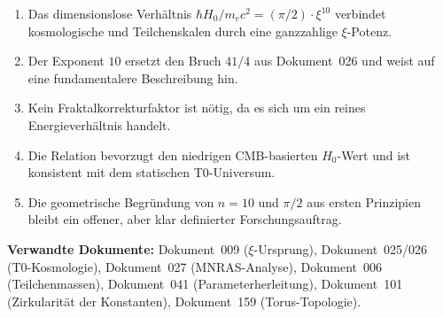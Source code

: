 \begin{foundation}
    \begin{enumerate}
        \item Das dimensionslose Verhältnis
              $\hbar H_0 / m_e c^2 = (\pi/2) \cdot \xi^{10}$ verbindet
              kosmologische und Teilchenskalen durch eine ganzzahlige
              $\xi$-Potenz.
        \item Der Exponent $10$ ersetzt den Bruch $41/4$ aus Dokument~026
              und weist auf eine fundamentalere Beschreibung hin.
        \item Kein Fraktal\-korrekturfaktor ist nötig, da es sich um ein
              reines Energieverhältnis handelt.
        \item Die Relation bevorzugt den niedrigen CMB-basierten
              $H_0$-Wert und ist konsistent mit dem statischen
              T0-Universum.
        \item Die geometrische Begründung von $n = 10$ und $\pi/2$ aus
              ersten Prinzipien bleibt ein offener, aber
              klar definierter Forschungsauftrag.
    \end{enumerate}
\end{foundation}

\vspace{1.5em}

\noindent\textbf{Verwandte Dokumente:}
Dokument~009 ($\xi$-Ursprung),
Dokument~025/026 (T0-Kosmologie),
Dokument~027 (MNRAS-Analyse),
Dokument~006 (Teilchenmassen),
Dokument~041 (Parameterherleitung),
Dokument~101 (Zirkularität der Konstanten),
Dokument~159 (Torus-Topologie).
